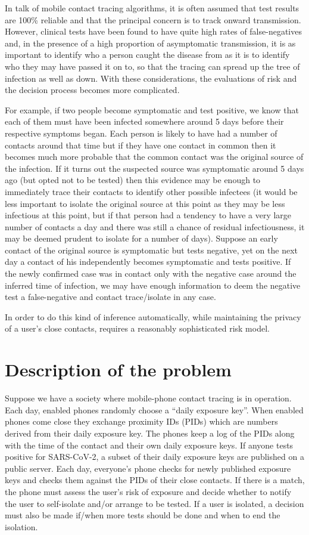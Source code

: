 \documentclass{article}
\begin{document}
In talk of mobile contact tracing algorithms, it is often assumed that test results are 100\% reliable and that the principal concern is to track onward transmission. However, clinical tests have been found to have quite high rates of false-negatives and, in the presence of a high proportion of asymptomatic transmission, it is as important to identify who a person caught the disease from as it is to identify who they may have passed it on to, so that the tracing can spread up the tree of infection as well as down. With these considerations, the evaluations of risk and the decision process becomes more complicated.

For example, if two people become symptomatic and test positive, we know that each of them must have been infected somewhere around 5 days before their respective symptoms began. Each person is likely to have had a number of contacts around that time but if they have one contact in common then it becomes much more probable that the common contact was the original source of the infection. If it turns out the suspected source was symptomatic around 5 days ago (but opted not to be tested) then this evidence may be enough to immediately trace their contacts to identify other possible infectees (it would be less important to isolate the original source at this point as they may be less infectious at this point, but if that person had a tendency to have a very large number of contacts a day and there was still a chance of residual infectiousness, it may be deemed prudent to isolate for a number of days). Suppose an early contact of the original source is symptomatic but tests negative, yet on the next day a contact of his independently becomes symptomatic and tests positive. If the newly confirmed case was in contact only with the negative case around the inferred time of infection, we may have enough information to deem the negative test a false-negative and contact trace/isolate in any case.

In order to do this kind of inference automatically, while maintaining the privacy of a user's close contacts, requires a reasonably sophisticated risk model.

\section{Description of the problem}

Suppose we have a society where mobile-phone contact tracing is in operation. Each day, enabled phones randomly choose a ``daily exposure key''. When enabled phones come close they exchange proximity IDs (PIDs) which are numbers derived from their daily exposure key. The phones keep a log of the PIDs along with the time of the contact and their own daily exposure keys. If anyone tests positive for SARS-CoV-2, a subset of their daily exposure keys are published on a public server. Each day, everyone's phone checks for newly published exposure keys and checks them against the PIDs of their close contacts. If there is a match, the phone must assess the user's risk of exposure and decide whether to notify the user to self-isolate and/or arrange to be tested. If a user is isolated, a decision must also be made if/when more tests should be done and when to end the isolation.
\end{document}

